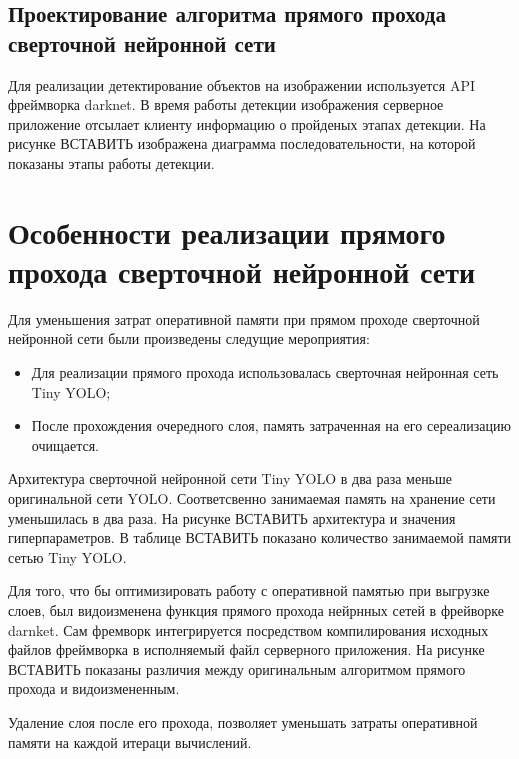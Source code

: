 \documentclass[a4paper,english,russian]{G2-105}
\begin{document}
\subsection{Проектирование алгоритма прямого прохода сверточной нейронной сети}
\par Для реализации детектирование объектов на изображении используется API фреймворка darknet. В время работы детекции изображения серверное приложение отсылает клиенту информацию о пройденых этапах детекции. На рисунке ВСТАВИТЬ изображена диаграмма последовательности, на которой показаны этапы работы детекции.
\section{Особенности реализации прямого прохода сверточной нейронной сети}
\par Для уменьшения затрат оперативной памяти при прямом проходе сверточной нейронной сети были произведены следущие мероприятия:
\begin{itemize}
\item Для реализации прямого прохода использовалась сверточная нейронная сеть Tiny YOLO;
\item После прохождения очередного слоя, память затраченная на его сереализацию очищается.
\end{itemize}
\par Архитектура сверточной нейронной сети Tiny YOLO в два раза меньше оригинальной сети YOLO. Соответсвенно занимаемая память на хранение сети уменьшилась в два раза. На рисунке ВСТАВИТЬ архитектура и значения гиперпараметров. В таблице ВСТАВИТЬ показано количество занимаемой памяти сетью Tiny YOLO.
\par Для того, что бы оптимизировать работу с оперативной памятью при выгрузке слоев, был видоизменена функция прямого прохода нейрнных сетей в фрейворке darnket. Сам фремворк интегрируется посредством компилирования исходных файлов фреймворка в исполняемый файл серверного приложения. На рисунке ВСТАВИТЬ показаны различия между оригинальным алгоритмом прямого прохода и видоизмененным.
\par Удаление слоя после его прохода, позволяет уменьшать затраты оперативной памяти на каждой итераци вычислений.
\end{document}
